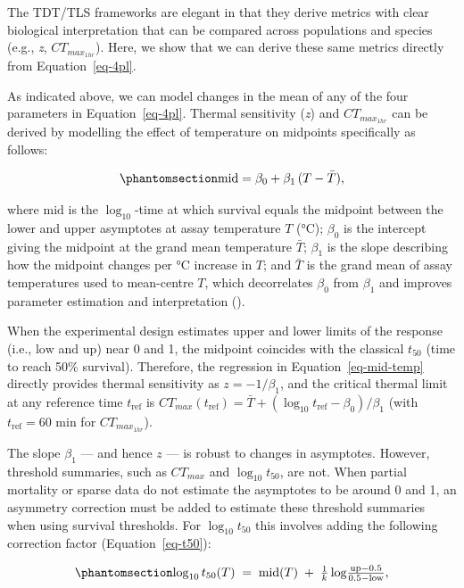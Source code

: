 \documentclass[
  11pt,
]{article}
\begin{document}
The TDT/TLS frameworks are elegant in that they derive metrics with
clear biological interpretation that can be compared across populations
and species (e.g., \emph{z}, \(CT_{max_{1hr}}\)). Here, we show that we
can derive these same metrics directly from Equation~\ref{eq-4pl}.

As indicated above, we can model changes in the mean of any of the four
parameters in Equation~\ref{eq-4pl}. Thermal sensitivity (\emph{z}) and
\(CT_{max_{1hr}}\) can be derived by modelling the effect of temperature
on midpoints specifically as follows:

\begin{equation}\phantomsection\label{eq-mid-temp}{
\text{mid} = \beta_0 + \beta_1\,(T - \bar{T}),
}\end{equation}

where \(\text{mid}\) is the \(\log_{10}\)-time at which survival equals
the midpoint between the lower and upper asymptotes at assay temperature
\(T\) (°C); \(\beta_0\) is the intercept giving the midpoint at the
grand mean temperature \(\bar{T}\); \(\beta_1\) is the slope describing
how the midpoint changes per °C increase in \(T\); and \(\bar{T}\) is
the grand mean of assay temperatures used to mean-centre \(T\), which
decorrelates \(\beta_0\) from \(\beta_1\) and improves parameter
estimation and interpretation
().

When the experimental design estimates upper and lower limits of the
response (i.e., \(\text{low}\) and \(\text{up}\)) near 0 and 1, the
midpoint coincides with the classical \(t_{50}\) (time to reach 50\%
survival). Therefore, the regression in Equation~\ref{eq-mid-temp}
directly provides thermal sensitivity as \(z = -1/\beta_1\), and the
critical thermal limit at any reference time \(t_\text{ref}\) is
\(CT_{max}(t_\text{ref}) = \bar{T} + (\log_{10} t_\text{ref} - \beta_0)/\beta_1\)
(with \(t_\text{ref} = 60\) min for \(CT_{max_{1hr}}\)).

The slope \(\beta_1\) --- and hence \(z\) --- is robust to changes in
asymptotes. However, threshold summaries, such as \(CT_{max}\) and
\(\log_{10}t_{50}\), are not. When partial mortality or sparse data do
not estimate the asymptotes to be around 0 and 1, an asymmetry
correction must be added to estimate these threshold summaries when
using survival thresholds. For \(\log_{10}t_{50}\) this involves adding
the following correction factor (Equation~\ref{eq-t50}):

\begin{equation}\phantomsection\label{eq-t50}{
\log_{10} t_{50}(T) \;=\; \text{mid}(T) \;+\; \tfrac{1}{k}\log\!\tfrac{\text{up} - 0.5}{0.5 - \text{low}},
}\end{equation}
\end{document}
